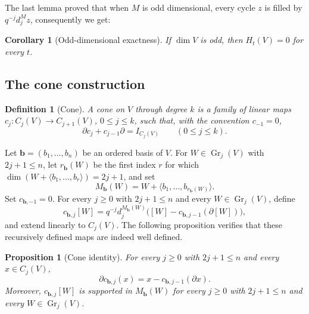 \documentclass[11pt]{article}
\numberwithin{equation}{section}
\newtheorem{proposition}[theorem]{Proposition}
\newtheorem{corollary}[theorem]{Corollary}
\newtheorem{definition}[theorem]{Definition}
\newcommand{\Gr}{\operatorname{Gr}}
\begin{document}
The last lemma proved that when $M$ is odd dimensional, every cycle $z$ is filled by $q^{-j}d_j^Mz$, consequently we get:
\begin{corollary}[Odd-dimensional exactness]
\label{cor:odd-dimensional-exactness}
If $\dim V$ is odd, then $H_t(V)=0$ for every $t$.
\end{corollary}

\subsection{The cone construction}

\begin{definition}[Cone]
A cone on $V$ through degree $k$ is a family of linear maps
$c_j:C_j(V)\to C_{j+1}(V)$, $0\le j\le k$, such that, with the
convention $c_{-1}=0$,
\[
 \partial c_j+c_{j-1}\partial=I_{C_j(V)}
 \qquad(0\le j\le k).
\]
\end{definition}

Let $\mathbf b=(b_1,\ldots,b_n)$ be an ordered basis of $V$. For
$W\in\Gr_j(V)$ with $2j+1\le n$, let $r_{\mathbf b}(W)$ be the first
index $r$ for which
$\dim(W+\langle b_1,\ldots,b_r\rangle)=2j+1$, and set
\[
 M_{\mathbf b}(W)
 =
 W+\langle b_1,\ldots,b_{r_{\mathbf b}(W)}\rangle.
\]
Set $c_{\mathbf b,-1}=0$. For every $j\ge0$ with $2j+1\le n$ and
every $W\in\Gr_j(V)$, define
\[
 c_{\mathbf b,j}[W]
 =
 q^{-j}d_j^{M_{\mathbf b}(W)}
 \bigl([W]-c_{\mathbf b,j-1}(\partial[W])\bigr),
\]
and extend linearly to $C_j(V)$.
The following proposition verifies that these recursively defined maps are indeed well defined.

\begin{proposition}[Cone identity]\label{prop:cone-identity}
For every $j\ge0$ with $2j+1\le n$ and every $x\in C_j(V)$,
\[
 \partial c_{\mathbf b,j}(x)
 =
 x-c_{\mathbf b,j-1}(\partial x).
\]
Moreover, $c_{\mathbf b,j}[W]$ is supported in
$M_{\mathbf b}(W)$ for every $j\ge0$ with $2j+1\le n$ and every
$W\in\Gr_j(V)$.
\end{proposition}
\end{document}
